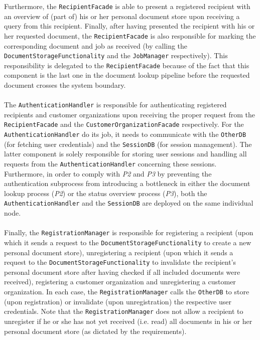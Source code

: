 \documentclass[a4paper,10pt]{article}
\begin{document}
Furthermore, the \texttt{RecipientFacade} is able to present a registered recipient with an overview of (part of) his or her personal document store upon receiving a query from this recipient. Finally, after having presented the recipient with his or her requested document, the \texttt{RecipientFacade} is also responsible for marking the corresponding document and job as received (by calling the \texttt{DocumentStorageFunctionality} and the \texttt{JobManager} respectively). This responsibility is delegated to the \texttt{RecipientFacade} because of the fact that this component is the last one in the document lookup pipeline before the requested document crosses the system boundary.\\\\
The \texttt{AuthenticationHandler} is responsible for authenticating registered recipients and customer organizations upon receiving the proper request from the \texttt{RecipientFacade} and the \texttt{CustomerOrganizationFacade} respectively. For the \texttt{AuthenticationHandler} do its job, it needs to communicate with the \texttt{OtherDB} (for fetching user credentials) and the \texttt{SessionDB} (for session management). The latter component is solely responsible for storing user sessions and handling all requests from the \texttt{AuthenticationHandler} concerning these sessions. Furthermore, in order to comply with \textit{P2} and \textit{P3} by preventing the authentication subprocess from introducing a bottleneck in either the document lookup process (\textit{P2}) or the status overview process (\textit{P3}), both the \texttt{AuthenticationHandler} and the \texttt{SessionDB} are deployed on the same individual node.\\\\
Finally, the \texttt{RegistrationManager} is responsible for registering a recipient (upon which it sends a request to the \texttt{DocumentStorageFunctionality} to create a new personal document store), unregistering a recipient (upon which it sends a request to the \texttt{DocumentStorageFunctionality} to invalidate the recipient's personal document store after having checked if all included documents were received), registering a customer organization and unregistering a customer organization. In each case, the \texttt{RegistrationManager} calls the \texttt{OtherDB} to store (upon registration) or invalidate (upon unregistration) the respective user credentials. Note that the \texttt{RegistrationManager} does not allow a recipient to unregister if he or she has not yet received (i.e. read) all documents in his or her personal document store (as dictated by the requirements).
\end{document}
